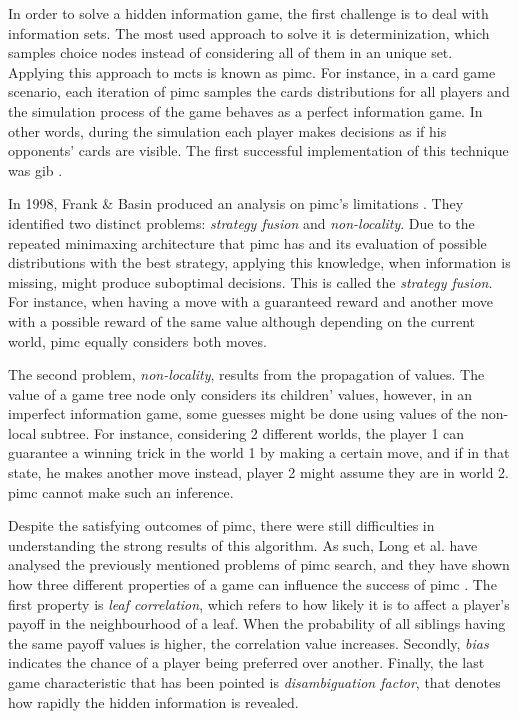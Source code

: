 In order to solve a hidden information game, the first challenge is to deal with information sets.
The most used approach to solve it is determinization, which samples choice nodes instead of considering all of them in an unique set.
Applying this approach to \gls{mcts} is known as \gls{pimc}.
For instance, in a card game scenario, each iteration of \gls{pimc} samples the cards distributions for all players and the simulation process of the game behaves as a perfect information game.
In other words, during the simulation each player makes decisions as if his opponents' cards are visible.
The first successful implementation of this technique was \gls{gib} \cite{Ginsberg2001}.


In 1998, Frank \& Basin produced an analysis on \gls{pimc}'s limitations \cite{Frank1998}.
They identified two distinct problems: \emph{strategy fusion} and \emph{non-locality}.
Due to the repeated minimaxing architecture that \gls{pimc} has and its evaluation of possible distributions with the best strategy, applying this knowledge, when information is missing, might produce suboptimal decisions.
This is called the \emph{strategy fusion}.
For instance, when having a move with a guaranteed reward and another move with a possible reward of the same value although depending on the current world, \gls{pimc} equally considers both moves.


The second problem, \emph{non-locality}, results from the propagation of values.
The value of a game tree node only considers its children' values, however, in an imperfect information game, some guesses might be done using values of the non-local subtree.
For instance, considering 2 different worlds, the player 1 can guarantee a winning trick in the world 1 by making a certain move, and if in that state, he makes another move instead, player 2 might assume they are in world 2.
\gls{pimc} cannot make such an inference.


Despite the satisfying outcomes of \gls{pimc}, there were still difficulties in understanding the strong results of this algorithm.
As such, Long et al. have analysed the previously mentioned problems of \gls{pimc} search, and they have shown how three different properties of a game can influence the success of \gls{pimc} \cite{Long2010}.
The first property is \emph{leaf correlation}, which refers to how likely it is to affect a player's payoff in the neighbourhood of a leaf.
When the probability of all siblings having the same payoff values is higher, the correlation value increases.
Secondly, \emph{bias} indicates the chance of a player being preferred over another.
Finally, the last game characteristic that has been pointed is \emph{disambiguation factor}, that denotes how rapidly the hidden information is revealed.


